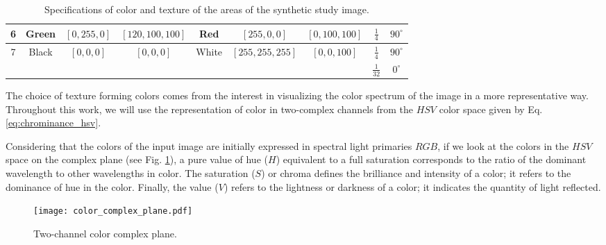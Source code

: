 \begin{table}[h!]
\begin{tabular}{c|c|c|c|c|c|c|c|c|}
\multicolumn{1}{|c|}{6}                  & Green                  & $[0,255,0]$                & $[120,100,100]$            & Red                    & $[255,0,0]$                      & $[0,100,100]$                & $\frac{1}{4}$              & $90^\circ$                \\ \hline
\multicolumn{1}{|c|}{\multirow{2}{*}{7}} & \multirow{2}{*}{Black} & \multirow{2}{*}{$[0,0,0]$} & \multirow{2}{*}{$[0,0,0]$} & \multirow{2}{*}{White} & \multirow{2}{*}{$[255,255,255]$} & \multirow{2}{*}{$[0,0,100]$} & $\frac{1}{4}$              & $90^\circ$                \\ \cline{8-9} 
\multicolumn{1}{|c|}{}                   &                        &                            &                            &                        &                                  &                              & $\frac{1}{32}$             & $0^\circ$                 \\ \hline
\end{tabular}
\caption{Specifications of color and texture of the areas of the synthetic study image.}\label{tab:synthetic_image_components}
\end{table}

The choice of texture forming colors comes from the interest in visualizing the color spectrum of the image in a more representative way. Throughout this work, we will use the representation of color in two-complex channels from the $HSV$ color space given by Eq. \eqref{eq:chrominance_hsv}.

Considering that the colors of the input image are initially expressed in spectral light primaries $RGB$, if we look at the colors in the $HSV$ space on the complex plane (see Fig. \ref{fig:color_complex_plane}), a pure value of hue ($H$) equivalent to a full saturation corresponds to the ratio of the dominant wavelength to other wavelengths in color. The saturation ($S$) or chroma defines the brilliance and intensity of a color; it refers to the dominance of hue in the color. Finally, the value ($V$) refers to the lightness or darkness of a color; it indicates the quantity of light reflected.

\begin{figure}
	\centering
    \texttt{[image: color\_complex\_plane.pdf]}
\caption{Two-channel color complex plane.}\label{fig:color_complex_plane}
\end{figure}

